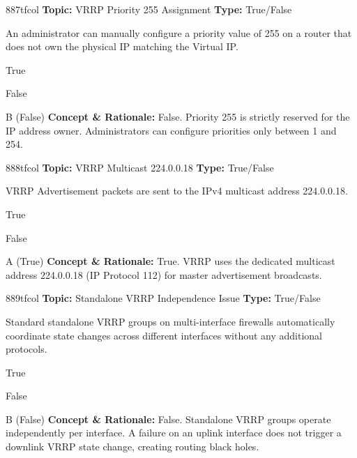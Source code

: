 \begin{qcard}{887}{tfcol}
\textcolor{darkslate!75}{\small\textbf{Topic:} VRRP Priority 255 Assignment \hfill \textbf{Type:} True/False}\vspace{0.4em}\par
An administrator can manually configure a priority value of 255 on a router that does not own the physical IP matching the Virtual IP.
\begin{qoptions}
\item True
\item False
\end{qoptions}
\end{qcard}
\nopagebreak
\begin{explainbox}{B (False)}
\textbf{Concept \& Rationale:} False. Priority 255 is strictly reserved for the IP address owner. Administrators can configure priorities only between 1 and 254.
\end{explainbox}

\begin{qcard}{888}{tfcol}
\textcolor{darkslate!75}{\small\textbf{Topic:} VRRP Multicast 224.0.0.18 \hfill \textbf{Type:} True/False}\vspace{0.4em}\par
VRRP Advertisement packets are sent to the IPv4 multicast address 224.0.0.18.
\begin{qoptions}
\item True
\item False
\end{qoptions}
\end{qcard}
\nopagebreak
\begin{explainbox}{A (True)}
\textbf{Concept \& Rationale:} True. VRRP uses the dedicated multicast address 224.0.0.18 (IP Protocol 112) for master advertisement broadcasts.
\end{explainbox}

\begin{qcard}{889}{tfcol}
\textcolor{darkslate!75}{\small\textbf{Topic:} Standalone VRRP Independence Issue \hfill \textbf{Type:} True/False}\vspace{0.4em}\par
Standard standalone VRRP groups on multi-interface firewalls automatically coordinate state changes across different interfaces without any additional protocols.
\begin{qoptions}
\item True
\item False
\end{qoptions}
\end{qcard}
\nopagebreak
\begin{explainbox}{B (False)}
\textbf{Concept \& Rationale:} False. Standalone VRRP groups operate independently per interface. A failure on an uplink interface does not trigger a downlink VRRP state change, creating routing black holes.
\end{explainbox}

